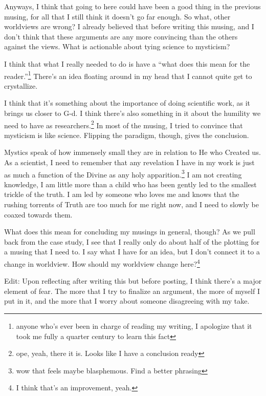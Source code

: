 \documentclass[12pt]{article}[titlepage]
\newcommand{\say}[1]{``#1''}
\newcommand{\1}{\={a}}
\newcommand{\2}{\={e}}
\newcommand{\3}{\={\i}}
\newcommand{\4}{\=o}
\newcommand{\5}{\=u}
\newcommand{\6}{\={A}}
\renewcommand{\,}{\textsuperscript{,}}
\begin{document}
Anyways, I think that going to here could have been a good thing in the previous musing, for all that I still think it doesn't go far enough.
So what, other worldviews are wrong? I already believed that before writing this musing, and I don't think that these arguments are any more convincing than the others against the views.
What is actionable about tying science to mysticism?

I think that what I really needed to do is have a \say{what does this mean for the reader.}\footnote{anyone who's ever been in charge of reading my writing, I apologize that it took me fully a quarter century to learn this fact}
There's an idea floating around in my head that I cannot quite get to crystallize.

I think that it's something about the importance of doing scientific work, as it brings us closer to G-d.
I think there's also something in it about the humility we need to have as researchers.\footnote{ope, yeah, there it is. Looks like I have a conclusion ready}
In most of the musing, I tried to convince that mysticism is like science.
Flipping the paradigm, though, gives the conclusion.

Mystics speak of how immensely small they are in relation to He who Created us.
As a scientist, I need to remember that any revelation I have in my work is just as much a function of the Divine as any holy apparition.\footnote{wow that feels maybe blasphemous. Find a better phrasing}
I am not creating knowledge, I am little more than a child who has been gently led to the smallest trickle of the truth.
I am led by someone who loves me and knows that the rushing torrents of Truth are too much for me right now, and I need to slowly be coaxed towards them.

What does this mean for concluding my musings in general, though?
As we pull back from the case study, I see that I really only do about half of the plotting for a musing that I need to.
I say what I have for an idea, but I don't connect it to a change in worldview.
How should my worldview change here?\footnote{I think that's an improvement, yeah.}

Edit: Upon reflecting after writing this but before posting, I think there's a major element of fear.
The more that I try to finalize an argument, the more of myself I put in it, and the more that I worry about someone disagreeing with my take.
\end{document}
